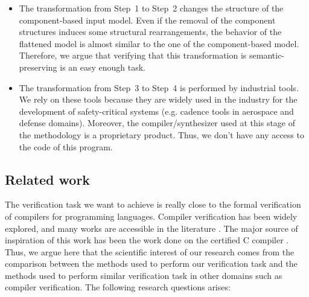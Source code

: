 \begin{itemize}
\item The transformation from Step~1 to Step~2 changes the structure
  of the component-based input model. Even if the removal of the
  component structures induces some structural rearrangements, the
  behavior of the flattened model is almost similar to the one of the
  component-based model. Therefore, we argue that verifying that this
  transformation is semantic-preser\-ving is an easy enough task.

\item The transformation from Step~3 to Step~4 is performed by
  industrial tools. We rely on these tools because they are widely
  used in the industry for the development of safety-critical systems
  (e.g. cadence tools in aerospace and defense domains). Moreover, the
  compiler/synthesizer used at this stage of the methodology is a
  proprietary product. Thus, we don't have any access to the code of
  this program. %
\end{itemize}



\subsection{Related work}
\label{sec:related-work}

The verification task we want to achieve is really close to the formal
verification of compilers for programming languages. Compiler
verification has been widely explored, and many works are accessible
in the literature \cite{Dave2003}. The major source of inspiration of
this work has been the work done on the \ccert{} certified C compiler
\cite{Leroy2009}. Thus, we argue here that the scientific interest of
our research comes from the comparison between the methods used to
perform our verification task and the methods used to perform similar
verification task in other domains such as compiler verification. The
following research questions arises:

